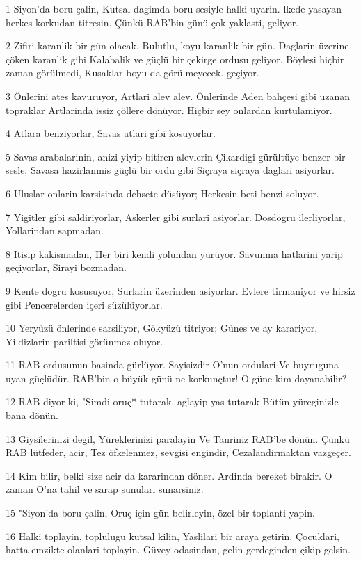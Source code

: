 \par 1 Siyon'da boru çalin, Kutsal dagimda boru sesiyle halki uyarin. lkede yasayan herkes korkudan titresin. Çünkü RAB'bin günü çok yaklasti, geliyor.
\par 2 Zifiri karanlik bir gün olacak, Bulutlu, koyu karanlik bir gün. Daglarin üzerine çöken karanlik gibi Kalabalik ve güçlü bir çekirge ordusu geliyor. Böylesi hiçbir zaman görülmedi, Kusaklar boyu da görülmeyecek. geçiyor.
\par 3 Önlerini ates kavuruyor, Artlari alev alev. Önlerinde Aden bahçesi gibi uzanan topraklar Artlarinda issiz çöllere dönüyor. Hiçbir sey onlardan kurtulamiyor.
\par 4 Atlara benziyorlar, Savas atlari gibi kosuyorlar.
\par 5 Savas arabalarinin, anizi yiyip bitiren alevlerin Çikardigi gürültüye benzer bir sesle, Savasa hazirlanmis güçlü bir ordu gibi Siçraya siçraya daglari asiyorlar.
\par 6 Uluslar onlarin karsisinda dehsete düsüyor; Herkesin beti benzi soluyor.
\par 7 Yigitler gibi saldiriyorlar, Askerler gibi surlari asiyorlar. Dosdogru ilerliyorlar, Yollarindan sapmadan.
\par 8 Itisip kakismadan, Her biri kendi yolundan yürüyor. Savunma hatlarini yarip geçiyorlar, Sirayi bozmadan.
\par 9 Kente dogru kosusuyor, Surlarin üzerinden asiyorlar. Evlere tirmaniyor ve hirsiz gibi Pencerelerden içeri süzülüyorlar.
\par 10 Yeryüzü önlerinde sarsiliyor, Gökyüzü titriyor; Günes ve ay karariyor, Yildizlarin pariltisi görünmez oluyor.
\par 11 RAB ordusunun basinda gürlüyor. Sayisizdir O'nun ordulari Ve buyruguna uyan güçlüdür. RAB'bin o büyük günü ne korkunçtur! O güne kim dayanabilir?
\par 12 RAB diyor ki, "Simdi oruç* tutarak, aglayip yas tutarak Bütün yüreginizle bana dönün.
\par 13 Giysilerinizi degil, Yüreklerinizi paralayin Ve Tanriniz RAB'be dönün. Çünkü RAB lütfeder, acir, Tez öfkelenmez, sevgisi engindir, Cezalandirmaktan vazgeçer.
\par 14 Kim bilir, belki size acir da kararindan döner. Ardinda bereket birakir. O zaman O'na tahil ve sarap sunulari sunarsiniz.
\par 15 "Siyon'da boru çalin, Oruç için gün belirleyin, özel bir toplanti yapin.
\par 16 Halki toplayin, toplulugu kutsal kilin, Yaslilari bir araya getirin. Çocuklari, hatta emzikte olanlari toplayin. Güvey odasindan, gelin gerdeginden çikip gelsin.
